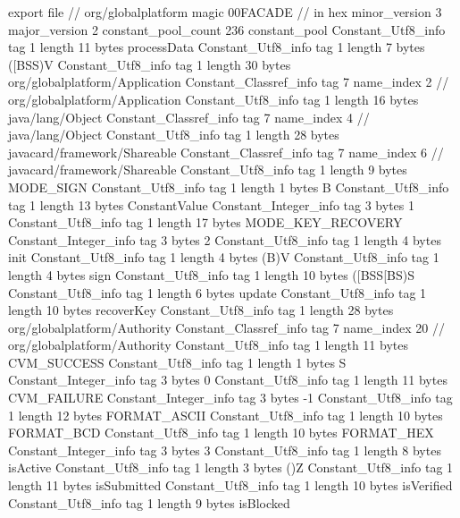 export file {		// org/globalplatform
	magic	00FACADE		 // in hex
	minor_version	3
	major_version	2
	constant_pool_count	236
	constant_pool {
		Constant_Utf8_info {
			tag	1
			length	11
			bytes	processData
		}
		Constant_Utf8_info {
			tag	1
			length	7
			bytes	([BSS)V
		}
		Constant_Utf8_info {
			tag	1
			length	30
			bytes	org/globalplatform/Application
		}
		Constant_Classref_info {
			tag	7
			name_index	2		// org/globalplatform/Application
		}
		Constant_Utf8_info {
			tag	1
			length	16
			bytes	java/lang/Object
		}
		Constant_Classref_info {
			tag	7
			name_index	4		// java/lang/Object
		}
		Constant_Utf8_info {
			tag	1
			length	28
			bytes	javacard/framework/Shareable
		}
		Constant_Classref_info {
			tag	7
			name_index	6		// javacard/framework/Shareable
		}
		Constant_Utf8_info {
			tag	1
			length	9
			bytes	MODE_SIGN
		}
		Constant_Utf8_info {
			tag	1
			length	1
			bytes	B
		}
		Constant_Utf8_info {
			tag	1
			length	13
			bytes	ConstantValue
		}
		Constant_Integer_info {
			tag	3
			bytes	1
		}
		Constant_Utf8_info {
			tag	1
			length	17
			bytes	MODE_KEY_RECOVERY
		}
		Constant_Integer_info {
			tag	3
			bytes	2
		}
		Constant_Utf8_info {
			tag	1
			length	4
			bytes	init
		}
		Constant_Utf8_info {
			tag	1
			length	4
			bytes	(B)V
		}
		Constant_Utf8_info {
			tag	1
			length	4
			bytes	sign
		}
		Constant_Utf8_info {
			tag	1
			length	10
			bytes	([BSS[BS)S
		}
		Constant_Utf8_info {
			tag	1
			length	6
			bytes	update
		}
		Constant_Utf8_info {
			tag	1
			length	10
			bytes	recoverKey
		}
		Constant_Utf8_info {
			tag	1
			length	28
			bytes	org/globalplatform/Authority
		}
		Constant_Classref_info {
			tag	7
			name_index	20		// org/globalplatform/Authority
		}
		Constant_Utf8_info {
			tag	1
			length	11
			bytes	CVM_SUCCESS
		}
		Constant_Utf8_info {
			tag	1
			length	1
			bytes	S
		}
		Constant_Integer_info {
			tag	3
			bytes	0
		}
		Constant_Utf8_info {
			tag	1
			length	11
			bytes	CVM_FAILURE
		}
		Constant_Integer_info {
			tag	3
			bytes	-1
		}
		Constant_Utf8_info {
			tag	1
			length	12
			bytes	FORMAT_ASCII
		}
		Constant_Utf8_info {
			tag	1
			length	10
			bytes	FORMAT_BCD
		}
		Constant_Utf8_info {
			tag	1
			length	10
			bytes	FORMAT_HEX
		}
		Constant_Integer_info {
			tag	3
			bytes	3
		}
		Constant_Utf8_info {
			tag	1
			length	8
			bytes	isActive
		}
		Constant_Utf8_info {
			tag	1
			length	3
			bytes	()Z
		}
		Constant_Utf8_info {
			tag	1
			length	11
			bytes	isSubmitted
		}
		Constant_Utf8_info {
			tag	1
			length	10
			bytes	isVerified
		}
		Constant_Utf8_info {
			tag	1
			length	9
			bytes	isBlocked
}}}
